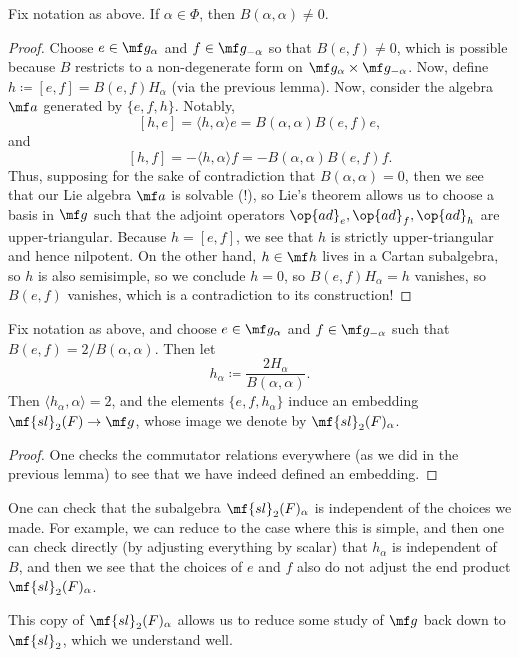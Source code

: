 \documentclass[../notes.tex]{subfiles}
\begin{document}
\begin{lemma}
	Fix notation as above. If $\alpha\in\Phi$, then $B(\alpha,\alpha)\ne0$.
\end{lemma}
\begin{proof}
	Choose $e\in\mf g_\alpha$ and $f\in\mf g_{-\alpha}$ so that $B(e,f)\ne0$, which is possible because $B$ restricts to a non-degenerate form on $\mf g_\alpha\times\mf g_{-\alpha}$. Now, define $h\coloneqq[e,f]=B(e,f)H_\alpha$ (via the previous lemma).  Now, consider the algebra $\mf a$ generated by $\{e,f,h\}$. Notably,
	\[[h,e]=\langle h,\alpha\rangle e=B(\alpha,\alpha)B(e,f)e,\]
	and
	\[[h,f]=-\langle h,\alpha\rangle f=-B(\alpha,\alpha)B(e,f)f.\]
	Thus, supposing for the sake of contradiction that $B(\alpha,\alpha)=0$, then we see that our Lie algebra $\mf a$ is solvable (!), so Lie's theorem allows us to choose a basis in $\mf g$ such that the adjoint operators ${\op{ad}_e},{\op{ad}_f},{\op{ad}_h}$ are upper-triangular. Because $h=[e,f]$, we see that $h$ is strictly upper-triangular and hence nilpotent. On the other hand, $h\in\mf h$ lives in a Cartan subalgebra, so $h$ is also semisimple, so we conclude $h=0$, so $B(e,f)H_\alpha=h$ vanishes, so $B(e,f)$ vanishes, which is a contradiction to its construction!
\end{proof}
\begin{proposition}
	Fix notation as above, and choose $e\in\mf g_\alpha$ and $f\in\mf g_{-\alpha}$ such that $B(e,f)=2/B(\alpha,\alpha)$. Then let
	\[h_\alpha\coloneqq\frac{2H_\alpha}{B(\alpha,\alpha)}.\]
	Then $\langle h_\alpha,\alpha\rangle=2$, and the elements $\{e,f,h_\alpha\}$ induce an embedding $\mf{sl}_2(F)\to\mf g$, whose image we denote by $\mf{sl}_2(F)_\alpha$.
\end{proposition}
\begin{proof}
	One checks the commutator relations everywhere (as we did in the previous lemma) to see that we have indeed defined an embedding.
\end{proof}
\begin{remark}
	One can check that the subalgebra $\mf{sl}_2(F)_\alpha$ is independent of the choices we made. For example, we can reduce to the case where this is simple, and then one can check directly (by adjusting everything by scalar) that $h_\alpha$ is independent of $B$, and then we see that the choices of $e$ and $f$ also do not adjust the end product $\mf{sl}_2(F)_\alpha$.
\end{remark}
This copy of $\mf{sl}_2(F)_\alpha$ allows us to reduce some study of $\mf g$ back down to $\mf{sl}_2$, which we understand well.
\end{document}
